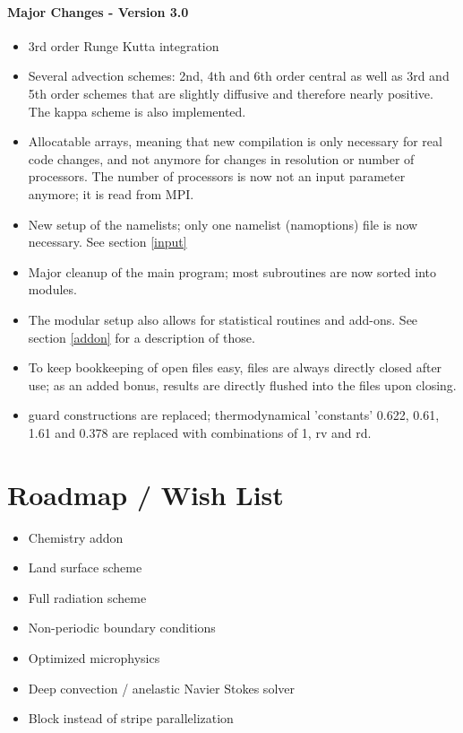\documentclass[a4paper,10pt]{article}
\begin{document}
\paragraph{Major Changes - Version 3.0}
\begin{itemize}
\item 3rd order Runge Kutta integration
\item Several advection schemes: 2nd, 4th and 6th order central as well as 3rd and 5th order schemes that are slightly diffusive and therefore nearly positive. The kappa scheme is also implemented.
\item Allocatable arrays, meaning that new compilation is only necessary for real code changes, and not anymore for changes in resolution or number of processors. The number of processors is now not an input parameter anymore; it is read from MPI.
\item New setup of the namelists; only one namelist (namoptions) file is now necessary. See section \ref{input}
\item Major cleanup of the main program; most subroutines are now sorted into modules.
\item The modular setup also allows for statistical routines and add-ons. See section \ref{addon} for a description of those.
\item To keep bookkeeping of open files easy, files are always directly closed after use; as an added bonus, results are directly flushed into the files upon closing.
\item guard constructions are replaced; thermodynamical 'constants' 0.622, 0.61, 1.61 and 0.378 are replaced with combinations of 1, rv and rd.
\end{itemize}

\section{Roadmap / Wish List}
\begin{itemize}
\item Chemistry addon
\item Land surface scheme
\item Full radiation scheme
\item Non-periodic boundary conditions
\item Optimized microphysics
\item Deep convection / anelastic Navier Stokes solver
\item Block instead of stripe parallelization
\end{itemize}
\end{document}
